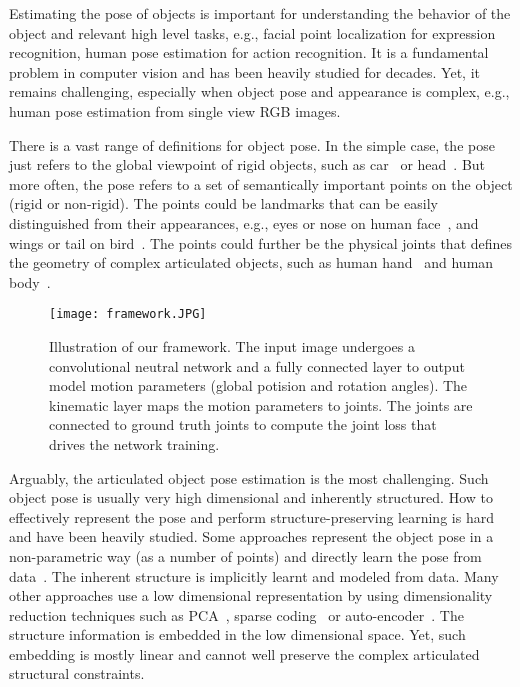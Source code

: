 \documentclass[runningheads]{llncs}
\begin{document}
Estimating the pose of objects is important for understanding the behavior of the object and relevant high level tasks, e.g., facial point localization for expression recognition, human pose estimation for action recognition. It is a fundamental problem in computer vision and has been heavily studied for decades. Yet, it remains challenging, especially when object pose and appearance is complex, e.g., human pose estimation from single view RGB images.

There is a vast range of definitions for object pose. In the simple case, the pose just refers to the global viewpoint of rigid objects, such as car~\cite{Zhu_2015_ICCV} or head~\cite{Meyer_2015_ICCV}. But more often, the pose refers to a set of semantically important points on the object (rigid or non-rigid). The points could be landmarks that can be easily distinguished from their appearances, e.g., eyes or nose on human face~\cite{Jourabloo_2016_CVPR}, and wings or tail on bird~\cite{yu2016deep}. The points could further be the physical joints that defines the geometry of complex articulated objects, such as human hand~\cite{zhou2016model,oberweger2015hands} and human body~\cite{li20143d,Zhou_2016_CVPR,Tekin_2016_CVPR}.

\begin{figure}
\begin{center}
\texttt{[image: framework.JPG]}
\end{center}
   \caption{Illustration of our framework. The input image undergoes a convolutional neutral network and a fully connected layer to output model motion parameters (global potision and rotation angles). The kinematic layer maps the motion parameters to joints. The joints are connected to ground truth joints to compute the joint loss that drives the network training.}
\label{fig:framework}
\end{figure}

Arguably, the articulated object pose estimation is the most challenging. Such object pose is usually very high dimensional and inherently structured. How to effectively represent the pose and perform structure-preserving learning is hard and have been heavily studied. Some approaches represent the object pose in a non-parametric way (as a number of points) and directly learn the pose from data~\cite{sun2015cascaded,shotton2013efficient,Carreira_2016_CVPR}. The inherent structure is implicitly learnt and modeled from data. Many other approaches use a low dimensional representation by using dimensionality reduction techniques such as PCA~\cite{ionescu2014human3,oberweger2015hands}, sparse coding~\cite{Wang_2014_CVPR,Zhou_2015_CVPR,Zhou_2016_CVPR} or auto-encoder~\cite{tekin2016structured}. The structure information is embedded in the low dimensional space. Yet, such embedding is mostly linear and cannot well preserve the complex articulated structural constraints.
\end{document}
